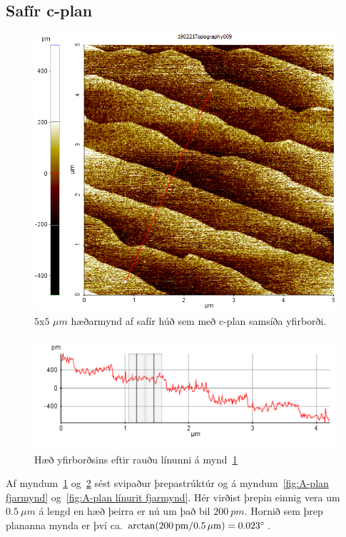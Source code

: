 \documentclass[11pt]{article}
\begin{document}
\subsection*{Safír c-plan}

\begin{figure}[H]
  \centering
    \includegraphics[width=145mm]{SAFIR-C/Screenshot_C.png}
    \caption{$5$x$5$ $\mu m$ hæðarmynd af safír húð sem með c-plan samsíða yfirborði.}
    \label{fig:C-plan fjarmynd} 
\end{figure}

\begin{figure}[H]
  \centering
    \includegraphics[width=145mm]{SAFIR-C/C_plan-linurit.PNG}
    \caption{Hæð yfirborðsins eftir rauðu línunni á mynd~\ref{fig:C-plan fjarmynd}}
    \label{fig:C-plan línurit fjarmynd}
\end{figure}

Af myndum~\ref{fig:C-plan fjarmynd} og~\ref{fig:C-plan línurit fjarmynd} sést svipaður þrepastrúktúr og á myndum~\ref{fig:A-plan fjarmynd} og~\ref{fig:A-plan línurit fjarmynd}. Hér virðist þrepin einnig vera um $\SI{0.5}{\mu m}$ á lengd en hæð þeirra er nú um það bil $\SI{200}{pm}$. Hornið sem þrep plananna mynda er því ca. $\arctan(\SI{200}{pm}/\SI{0.5}{\mu m}) = 0.023\degree$.
\end{document}
